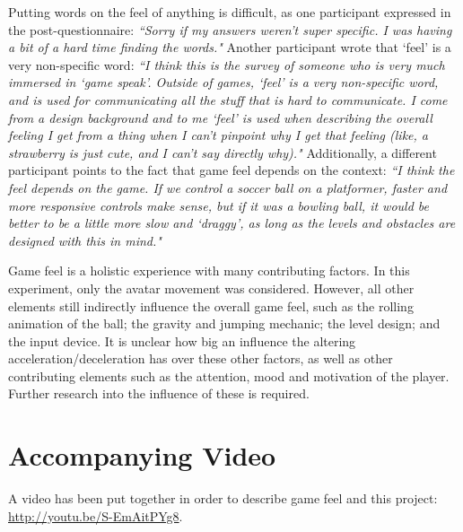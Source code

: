 Putting words on the feel of anything is difficult, as one participant expressed in the post-questionnaire: \textit{``Sorry if my answers weren't super specific. I was having a bit of a hard time finding the words."} Another participant wrote that `feel' is a very non-specific word: \textit{``I think this is the survey of someone who is very much immersed in `game speak'. Outside of games, `feel' is a very non-specific word, and is used for communicating all the stuff that is hard to communicate. I come from a design background and to me `feel' is used when describing the overall feeling I get from a thing when I can't pinpoint why I get that feeling (like, a strawberry is just cute, and I can't say directly why)."} Additionally, a different participant points to the fact that game feel depends on the context: \textit{``I think the feel depends on the game. If we control a soccer ball on a platformer, faster and more responsive controls make sense, but if it was a bowling ball, it would be better to be a little more slow and `draggy', as long as the levels and obstacles are designed with this in mind."}

Game feel is a holistic experience with many contributing factors. In this experiment, only the avatar movement was considered. However, all other elements still indirectly influence the overall game feel, such as the rolling animation of the ball; the gravity and jumping mechanic; the level design; and the input device. It is unclear how big an influence the altering acceleration/deceleration has over these other factors, as well as other contributing elements such as the attention, mood and motivation of the player. Further research into the influence of these is required.

\section{Accompanying Video}
A video has been put together in order to describe game feel and this project: \url{http://youtu.be/S-EmAitPYg8}.